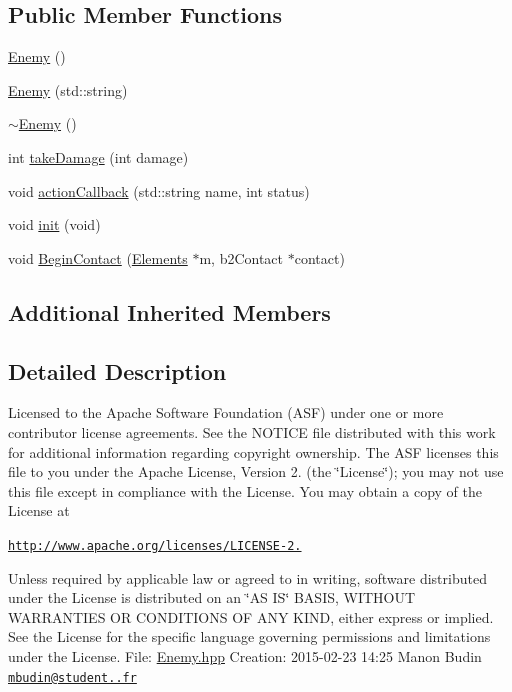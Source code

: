 \subsection*{Public Member Functions}
\begin{DoxyCompactItemize}
\item 
\hyperlink{class_enemy_a94f30d348b6d2840fd71675472ba38dd}{Enemy} ()
\item 
\hyperlink{class_enemy_a258ddb71f2f298663dc1ff988dcfd2e2}{Enemy} (std\-::string)
\item 
\hyperlink{class_enemy_ac0eec4755e28c02688065f9657150ac3}{$\sim$\-Enemy} ()
\item 
int \hyperlink{class_enemy_ae4335909ac929e5e5db7eb01b15fbce8}{take\-Damage} (int damage)
\item 
void \hyperlink{class_enemy_a2f1157b7c8d74371c2b06493563423ee}{action\-Callback} (std\-::string name, int status)
\item 
void \hyperlink{class_enemy_a4ed496f92f8c791133494d24b4eeaff6}{init} (void)
\item 
void \hyperlink{class_enemy_a3938e3e2cf5f07d809e1f1927b09539a}{Begin\-Contact} (\hyperlink{class_elements}{Elements} $\ast$m, b2\-Contact $\ast$contact)
\end{DoxyCompactItemize}
\subsection*{Additional Inherited Members}


\subsection{Detailed Description}
Licensed to the Apache Software Foundation (A\-S\-F) under one or more contributor license agreements. See the N\-O\-T\-I\-C\-E file distributed with this work for additional information regarding copyright ownership. The A\-S\-F licenses this file to you under the Apache License, Version 2. (the \char`\"{}\-License\char`\"{}); you may not use this file except in compliance with the License. You may obtain a copy of the License at

\href{http://www.apache.org/licenses/LICENSE-2.0}{\tt http\-://www.\-apache.\-org/licenses/\-L\-I\-C\-E\-N\-S\-E-\/2.}

Unless required by applicable law or agreed to in writing, software distributed under the License is distributed on an \char`\"{}\-A\-S I\-S\char`\"{} B\-A\-S\-I\-S, W\-I\-T\-H\-O\-U\-T W\-A\-R\-R\-A\-N\-T\-I\-E\-S O\-R C\-O\-N\-D\-I\-T\-I\-O\-N\-S O\-F A\-N\-Y K\-I\-N\-D, either express or implied. See the License for the specific language governing permissions and limitations under the License. File\-: \hyperlink{_enemy_8hpp}{Enemy.\-hpp} Creation\-: 2015-\/02-\/23 14\-:25 Manon Budin \href{mailto:mbudin@student.42.fr}{\tt mbudin@student..\-fr} 

